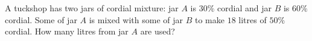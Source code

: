A tuckshop has two jars of cordial mixture: jar $A$ is $30\%$ cordial and jar $B$ is $60\%$ cordial. Some of jar $A$ is mixed with some of jar $B$ to make $18$ litres of $50\%$ cordial. How many litres from jar $A$ are used?
